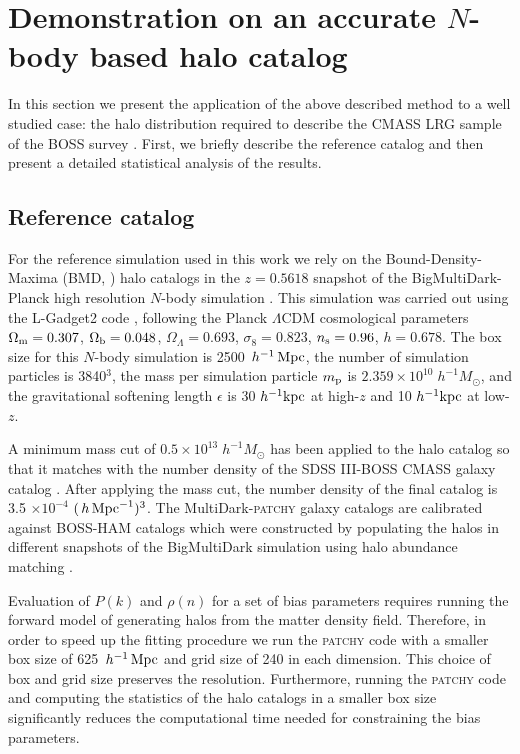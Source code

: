 \documentclass[english,usenatbib]{mn2e}
\newcommand{\mperh}{\,h^{-1}\,{\rm Mpc}}
\newcommand{\hperm}{\,h\,{\rm Mpc}^{-1}}
\begin{document}
\section{Demonstration on an accurate $N$-body based halo catalog}\label{sec:test}

In this section we present the application of the above described method to a well studied case: the halo distribution required to describe the CMASS LRG sample of the BOSS survey \citep{white2011,Dawson2013}.
First, we briefly describe the reference catalog and then present a detailed statistical analysis of the results.

\subsection{Reference catalog}
\label{sec:reference}

For the reference simulation used in this work we rely on the Bound-Density-Maxima (BMD, \citealt{bdm}) halo catalogs in the $z=0.5618$ snapshot of the BigMultiDark-Planck high 
resolution $N$-body simulation \citep{multidark}. This simulation was carried out using the L-Gadget2 code \citep{gadget}, following the Planck $\Lambda$CDM cosmological parameters 
$\Omega_{\rm m} = 0.307$, $\Omega_{\rm b} = 0.048$, $\Omega_{\Lambda} = 0.693$, $\sigma_{8} = 0.823$, $n_{\rm s}=0.96$, 
$h=0.678$. The box size for this $N$-body simulation is 2500 $\mperh$, the number of simulation particles is 3840$^3$, 
the mass per simulation particle $m_{\rm p}$ is $2.359 \times 10^{10} \; h^{-1} M_{\odot}$, and the gravitational softening length 
$\epsilon$ is 30 $h^{-1} \rm{kpc}$ at high-$z$ and 10 $h^{-1} \rm{kpc}$ at low-$z$.

A minimum mass cut of $0.5 \times 10^{13} \; h^{-1} M_{\odot}$ has been applied to the halo catalog so that it matches with the number density of the SDSS III-BOSS CMASS galaxy catalog \citep{white2011,Dawson2013}. After applying the mass cut, the number density of the final catalog is 3.5 $\times 10^{-4}$ $(\hperm)^{3}$. The MultiDark-\textsc{patchy} galaxy catalogs \citep{kitaura2016} are calibrated against BOSS-HAM catalogs which were constructed by populating the halos in different snapshots of the BigMultiDark simulation using halo abundance matching \citep{sergio2016}.   

Evaluation of $P(k)$ and $\rho(n)$ for a set of bias parameters requires running the forward model of generating halos from the matter density field. Therefore, in order to speed up the fitting procedure we run the \textsc{patchy} code with a smaller box size of 625 $\mperh$ and grid size of 240 in each dimension. This choice of box and grid size preserves the resolution. Furthermore, running the \textsc{patchy} code and computing the statistics of the halo catalogs in a smaller box size significantly reduces the computational time needed for constraining the bias parameters.
\end{document}
